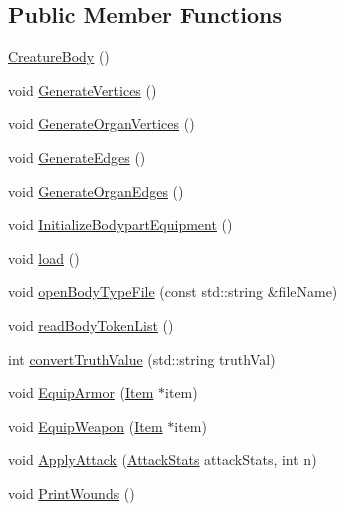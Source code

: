 \subsection*{Public Member Functions}
\begin{DoxyCompactItemize}
\item 
\mbox{\hyperlink{class_creature_body_ad40931736728dce1b6cf2c235c883695}{Creature\+Body}} ()
\item 
void \mbox{\hyperlink{class_creature_body_af7047fb13005abbb9a816c0dd64af873}{Generate\+Vertices}} ()
\item 
void \mbox{\hyperlink{class_creature_body_a9cf5cffe6209ed851bf32c2b164d9391}{Generate\+Organ\+Vertices}} ()
\item 
void \mbox{\hyperlink{class_creature_body_a8feda2cfc35e1b76730a31eb368ffed6}{Generate\+Edges}} ()
\item 
void \mbox{\hyperlink{class_creature_body_af1303a40606bf06aed980f14e7027d54}{Generate\+Organ\+Edges}} ()
\item 
void \mbox{\hyperlink{class_creature_body_af2b152c045862bb0fbc370b444bf98f0}{Initialize\+Bodypart\+Equipment}} ()
\item 
void \mbox{\hyperlink{class_creature_body_a947efb646a893964de6244b886bab038}{load}} ()
\item 
void \mbox{\hyperlink{class_creature_body_ac4140e081c8970ad4330c253c615ba33}{open\+Body\+Type\+File}} (const std\+::string \&file\+Name)
\item 
void \mbox{\hyperlink{class_creature_body_a52d765dd974e81a549fd0cb27b355cf2}{read\+Body\+Token\+List}} ()
\item 
int \mbox{\hyperlink{class_creature_body_a2e5f101eb4ce889f47810e8e65164d50}{convert\+Truth\+Value}} (std\+::string truth\+Val)
\item 
void \mbox{\hyperlink{class_creature_body_a5a14d8decef3d1051ac7e9d79a1a4b72}{Equip\+Armor}} (\mbox{\hyperlink{class_item}{Item}} $\ast$item)
\item 
void \mbox{\hyperlink{class_creature_body_af329b825db569100370683f7a9b0263c}{Equip\+Weapon}} (\mbox{\hyperlink{class_item}{Item}} $\ast$item)
\item 
void \mbox{\hyperlink{class_creature_body_aa6525bf32e8f99cc5bd1bda76044964d}{Apply\+Attack}} (\mbox{\hyperlink{struct_attack_stats}{Attack\+Stats}} attack\+Stats, int n)
\item 
void \mbox{\hyperlink{class_creature_body_a82e519351551538b1138fea170776f3f}{Print\+Wounds}} ()
\end{DoxyCompactItemize}
